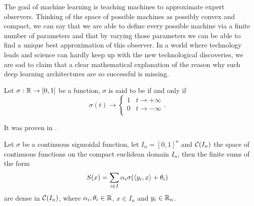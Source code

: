 \documentclass[../2.tex]{subfiles}
\begin{document}
    The goal of machine learning is teaching machines to approximate expert observers.
    Thinking of the space of possible machines as possibly convex and compact, we can say that we are able to define every possible machine
    via a finite number of parameters and that by varying those parameters we can be able to find a unique best approximation of this observer.
    In a world where technology leads and science can hardly keep up with the new technological discoveries, we are sad to claim that a clear mathematical
    explanation of the reason why such deep learning architectures are so successful is missing.
    
    \begin{defn}
        Let $\sigma : \mathbb{R} \to [0,1]$ be a function,
        $\sigma$ is said to be  if and only if
        \[ \sigma(t) \to 
            \begin{cases}
                1 & t \to +\infty\\
                0 & t \to -\infty\\
            \end{cases}. \]
    \end{defn}
    It was proven in \cite{}.
    \begin{thm}
        Let $\sigma$ be a continuous sigmoidal function, let $I_n = [0,1]^n$ and $\mathcal{C}(I_n)$ the space of continuous functions on the compact
        euclidean domain $I_n$, then the finite sums of the form 
        \[ S(x) = \sum_{i \in I} \alpha_i \sigma(\langle y_i, x \rangle+\theta_i)\]
        are dense in $\mathcal{C}(I_n)$, where $\alpha_i,\theta_i \in \mathbb{R}$, $x \in I_n$ and $y_i \in \mathbb{R}_n$.
    \end{thm}
    \begin{defn}
    \end{defn}
    \begin{defn}
    \end{defn}    
    \begin{defn}
    \end{defn}
    \begin{defn}
    \end{defn}
    \begin{defn}
    \end{defn}
    \begin{defn}[CNN]
    \end{defn}
    \begin{defn}
    \end{defn}
\end{document}
